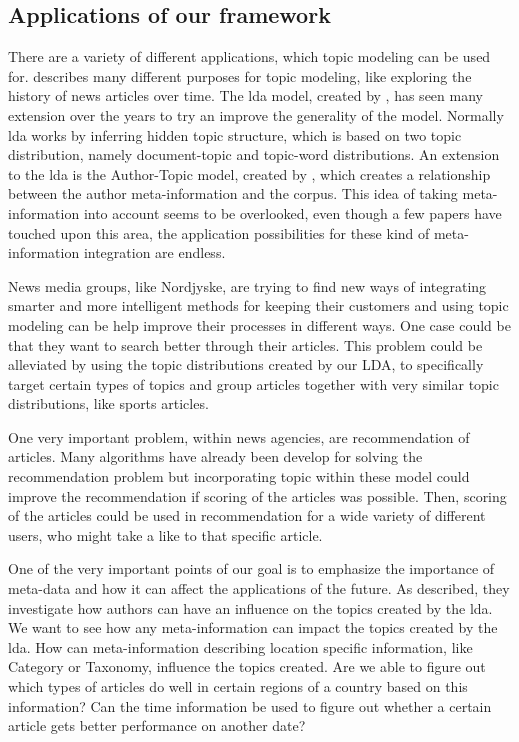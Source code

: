 \subsection{Applications of our framework}\label{sec:appendix_applications}
There are a variety of different applications, which topic modeling can be used for. 
\citet{Probabilistic_Topic_Models} describes many different purposes for topic modeling, like exploring the history of news articles over time.
The \gls{lda} model, created by \citet{blei2003latent}, has seen many extension over the years to try an improve the generality of the model.
Normally \gls{lda} works by inferring hidden topic structure, which is based on two topic distribution, namely document-topic and topic-word distributions. 
An extension to the \gls{lda} is the Author-Topic model, created by \citet{author_topic_2012}, which creates a relationship between the author meta-information and the corpus.
This idea of taking meta-information into account seems to be overlooked, even though a few papers have touched upon this area, the application possibilities for these kind of meta-information integration are endless.

News media groups, like Nordjyske, are trying to find new ways of integrating smarter and more intelligent methods for keeping their customers and using topic modeling can be help improve their processes in different ways.
One case could be that they want to search better through their articles.
This problem could be alleviated by using the topic distributions created by our LDA, to specifically target certain types of topics and group articles together with very similar topic distributions, like sports articles.

One very important problem, within news agencies, are recommendation of articles.
Many algorithms have already been develop for solving the recommendation problem but incorporating topic within these model could improve the recommendation if scoring of the articles was possible.
Then, scoring of the articles could be used in recommendation for a wide variety of different users, who might take a like to that specific article.     

One of the very important points of our goal is to emphasize the importance of meta-data and how it can affect the applications of the future.
As \citet{author_topic_2012} described, they investigate how authors can have an influence on the topics created by the \gls{lda}.
We want to see how any meta-information can impact the topics created by the \gls{lda}. 
How can meta-information describing location specific information, like Category or Taxonomy, influence the topics created.
Are we able to figure out which types of articles do well in certain regions of a country based on this information? 
Can the time information be used to figure out whether a certain article gets better performance on another date?